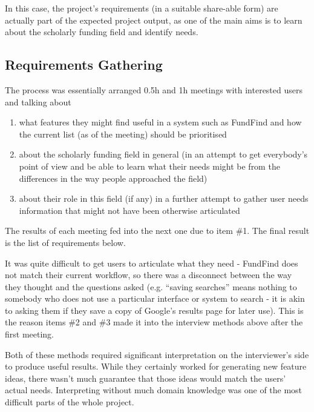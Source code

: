 
In this case, the project's requirements (in a suitable share-able form) are actually part of the expected project output, as one of the main aims is to learn about the scholarly funding field and identify needs.

\subsection{Requirements Gathering}
The process was essentially arranged 0.5h and 1h meetings with interested users and talking about

\begin{enumerate}
 \item what features they might find useful in a system such as FundFind and how the current list (as of the meeting) should be prioritised
 \item about the scholarly funding field in general (in an attempt to get everybody's point of view and be able to learn what their needs might be from the differences in the way people approached the field)
 \item about their role in this field (if any) in a further attempt to gather user needs information that might not have been otherwise articulated
\end{enumerate}

The results of each meeting fed into the next one due to item \#1. The final result is the list of requirements below.

It was quite difficult to get users to articulate what they need - FundFind does not match their current workflow, so there was a disconnect between the way they thought and the questions asked (e.g. ``saving searches'' means nothing to somebody who does not use a particular interface or system to search - it is akin to asking them if they save a copy of Google's results page for later use). This is the reason items \#2 and \#3 made it into the interview methods above after the first meeting.

Both of these methods required significant interpretation on the interviewer's side to produce useful results. While they certainly worked for generating new feature ideas, there wasn't much guarantee that those ideas would match the users' actual needs. Interpreting without much domain knowledge was one of the most difficult parts of the whole project.

